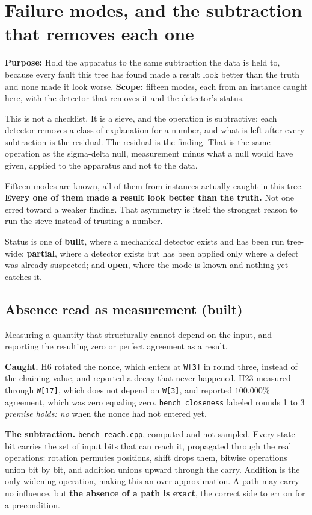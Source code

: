 \chapter{Failure modes, and the subtraction that removes each one}

\textbf{Purpose:} Hold the apparatus to the same subtraction the data is held to, because every fault this tree has found made a result look better than the truth and none made it look worse. \textbf{Scope:} fifteen modes, each from an instance caught here, with the detector that removes it and the detector's status.

This is not a checklist. It is a sieve, and the operation is subtractive: each detector removes a class of explanation for a number, and what is left after every subtraction is the residual. The residual is the finding. That is the same operation as the sigma-delta null, measurement minus what a null would have given, applied to the apparatus and not to the data.

Fifteen modes are known, all of them from instances actually caught in this tree. \textbf{Every one of them made a result look better than the truth.} Not one erred toward a weaker finding. That asymmetry is itself the strongest reason to run the sieve instead of trusting a number.

Status is one of \textbf{built}, where a mechanical detector exists and has been run tree-wide; \textbf{partial}, where a detector exists but has been applied only where a defect was already suspected; and \textbf{open}, where the mode is known and nothing yet catches it.

\section{Absence read as measurement (built)}

Measuring a quantity that structurally cannot depend on the input, and reporting the resulting zero or perfect agreement as a result.

\textbf{Caught.} H6 rotated the nonce, which enters at \texttt{W[3]} in round three, instead of the chaining value, and reported a decay that never happened. H23 measured through \texttt{W[17]}, which does not depend on \texttt{W[3]}, and reported \(100.000\%\) agreement, which was zero equaling zero. \texttt{bench\_closeness} labeled rounds 1 to 3 \emph{premise holds: no} when the nonce had not entered yet.

\textbf{The subtraction.} \texttt{bench\_reach.cpp}, computed and not sampled. Every state bit carries the set of input bits that can reach it, propagated through the real operations: rotation permutes positions, shift drops them, bitwise operations union bit by bit, and addition unions upward through the carry. Addition is the only widening operation, making this an over-approximation. A path may carry no influence, but \textbf{the absence of a path is exact}, the correct side to err on for a precondition.

